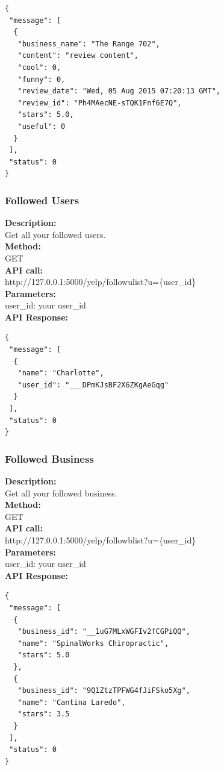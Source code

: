 \documentclass[12pt]{article}
\begin{document}
\begin{singlespacing}
\begin{lstlisting}
{
 "message": [
  {
   "business_name": "The Range 702",
   "content": "review content",
   "cool": 0,
   "funny": 0,
   "review_date": "Wed, 05 Aug 2015 07:20:13 GMT",
   "review_id": "Ph4MAecNE-sTQK1Fnf6E7Q",
   "stars": 5.0,
   "useful": 0
  }
 ],
 "status": 0
}
\end{lstlisting}
\end{singlespacing}

\subsubsection{Followed Users}
\textbf{Description:}\\
Get all your followed users.\\
\textbf{Method:}\\
GET\\
\textbf{API call:}\\ 
http://127.0.0.1:5000/yelp/followulist?u=\{user\_id\}\\
\textbf{Parameters:}\\
user\_id: your user\_id\\
\textbf{API Response:}

\begin{singlespacing}
\begin{lstlisting}
{
 "message": [
  {
   "name": "Charlotte",
   "user_id": "___DPmKJsBF2X6ZKgAeGqg"
  }
 ],
 "status": 0
}
\end{lstlisting}
\end{singlespacing}

\subsubsection{Followed Business}
\textbf{Description:}\\
Get all your followed business.\\
\textbf{Method:}\\
GET\\
\textbf{API call:}\\ 
http://127.0.0.1:5000/yelp/followblist?u=\{user\_id\}\\
\textbf{Parameters:}\\
user\_id: your user\_id\\
\textbf{API Response:}

\begin{singlespacing}
\begin{lstlisting}
{
 "message": [
  {
   "business_id": "__1uG7MLxWGFIv2fCGPiQQ",
   "name": "SpinalWorks Chiropractic",
   "stars": 5.0
  },
  {
   "business_id": "9Q1ZtzTPFWG4fJiFSko5Xg",
   "name": "Cantina Laredo",
   "stars": 3.5
  }
 ],
 "status": 0
}
\end{lstlisting}
\end{singlespacing}
\end{document}
